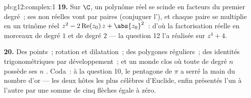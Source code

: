 \begin{solution}{pb:g12:complex:1}
\textbf{19.} Sur $\C$, un polynôme réel se scinde en facteurs du
premier degré~; ses  non réelles vont par paires 
(conjuguer l'), et chaque paire se multiplie en un trinôme
réel $z^2 - 2\operatorname{Re}(z_0)\,z + \abs{z_0}^2$~: d'où la
factorisation réelle en morceaux de degré $1$ et de degré $2$ ---
la question 12 l'a réalisée sur $z^4 + 4$.

\textbf{20.} Des points~; rotation et dilatation~; des polygones
réguliers~; des identités trigonométriques par développement~; et
un monde clos où toute  de degré $n$ possède ses $n$
. Coda~: à la question 10, le pentagone de $\pi$ a serré la
main du nombre d'or --- les deux hôtes les plus célèbres d'Euclide,
enfin présentés l'un à l'autre par une somme de cinq flèches égale
à zéro.
\end{solution}
